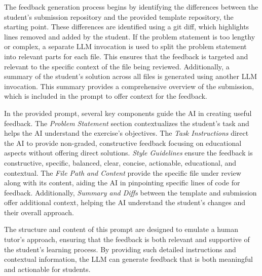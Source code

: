 \documentclass[manuscript,screen,review]{acmart}
\begin{document}
The feedback generation process begins by identifying the differences between the student's submission repository and the provided template repository, the starting point. 
These differences are identified using a git diff, which highlights lines removed and added by the student. 
If the problem statement is too lengthy or complex, a separate LLM invocation is used to split the problem statement into relevant parts for each file. 
This ensures that the feedback is targeted and relevant to the specific context of the file being reviewed. 
Additionally, a summary of the student's solution across all files is generated using another LLM invocation. 
This summary provides a comprehensive overview of the submission, which is included in the prompt to offer context for the feedback.

In the provided prompt, several key components guide the AI in creating useful feedback. The \textit{Problem Statement} section contextualizes the student's task and helps the AI understand the exercise's objectives.
The \textit{Task Instructions} direct the AI to provide non-graded, constructive feedback focusing on educational aspects without offering direct solutions.
\textit{Style Guidelines} ensure the feedback is constructive, specific, balanced, clear, concise, actionable, educational, and contextual.
The \textit{File Path and Content} provide the specific file under review along with its content, aiding the AI in pinpointing specific lines of code for feedback.
Additionally, \textit{Summary and Diffs} between the template and submission offer additional context, helping the AI understand the student's changes and their overall approach.

The structure and content of this prompt are designed to emulate a human tutor's approach, ensuring that the feedback is both relevant and supportive of the student's learning process.
By providing such detailed instructions and contextual information, the LLM can generate feedback that is both meaningful and actionable for students.
\end{document}
